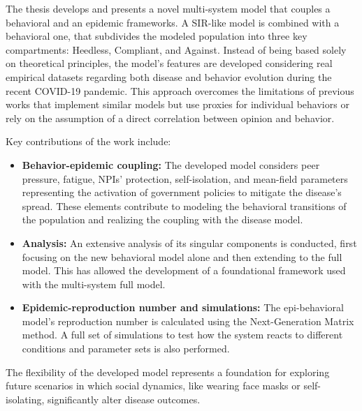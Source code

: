 The thesis develops and presents a novel multi-system model that couples a behavioral and an epidemic frameworks. A SIR-like model is combined with a behavioral one, that subdivides the modeled population into three key compartments: Heedless, Compliant, and Against. Instead of being based solely on theoretical principles, the model's features are developed considering real empirical datasets regarding both disease and behavior evolution during the recent COVID-19 pandemic. This approach overcomes the limitations of previous works that implement similar models but use proxies for individual behaviors or rely on the assumption of a direct correlation between opinion and behavior.

Key contributions of the work include:
\begin{itemize}
	\item \textbf{Behavior-epidemic coupling:} The developed model considers peer pressure, fatigue, NPIs' protection, self-isolation, and mean-field parameters representing the activation of government policies to mitigate the disease's spread. These elements contribute to modeling the behavioral transitions of the population and realizing the coupling with the disease model.
	\item \textbf{Analysis:} An extensive analysis of its singular components is conducted, first focusing on the new behavioral model alone and then extending to the full model. This has allowed the development of a foundational framework used with the multi-system full model.
	\item \textbf{Epidemic-reproduction number and simulations:} The epi-behavioral model's reproduction number is calculated using the Next-Generation Matrix method. A full set of simulations to test how the system reacts to different conditions and parameter sets is also performed.
\end{itemize}
The flexibility of the developed model represents a foundation for exploring future scenarios in which social dynamics, like wearing face masks or self-isolating, significantly alter disease outcomes.